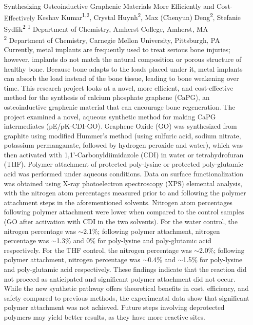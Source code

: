 \makeabstract
    {
    Synthesizing Osteoinductive Graphenic Materials More Efficiently and Cost-Effectively
    }
    {
    Keshav Kumar\textsuperscript{1,2}, Crystal Huynh\textsuperscript{2}, Max (Chenyun) Deng\textsuperscript{2}, Stefanie Sydlik\textsuperscript{2}
    }
    {
    \textsuperscript{1} Department of Chemistry, Amherst College, Amherst, MA\\
\textsuperscript{2} Department of Chemistry, Carnegie Mellon University, Pittsburgh, PA
    }
    {
    Currently, metal implants are frequently used to treat serious bone injuries; however, implants do not match the natural composition or porous structure of healthy bone. Because bone adapts to the loads placed under it, metal implants can absorb the load instead of the bone tissue, leading to bone weakening over time. This research project looks at a novel, more efficient, and cost-effective method for the synthesis of calcium phosphate graphene (CaPG), an osteoinductive graphenic material that can encourage bone regeneration.
    }
    {
    The project examined a novel, aqueous synthetic method for making CaPG intermediates (pE/pK-CDI-GO). Graphene Oxide (GO) was synthesized from graphite using modified Hummer{\textquoteright}s method (using sulfuric acid, sodium nitrate, potassium permanganate, followed by hydrogen peroxide and water), which was then activated with 1,1'-Carbonyldiimidazole (CDI) in water or tetrahydrofuran (THF). Polymer attachment of protected poly-lysine or protected poly-glutamic acid was performed under aqueous conditions. Data on surface functionalization was obtained using X-ray photoelectron spectroscopy (XPS) elemental analysis, with the nitrogen atom percentages measured prior to and following the polymer attachment steps in the aforementioned solvents.
    }
    {
    Nitrogen atom percentages following polymer attachment were lower when compared to the control samples (GO after activation with CDI in the two solvents). For the water control, the nitrogen percentage was $\sim$2.1\%; following polymer attachment, nitrogen percentage was $\sim$1.3\% and 0\% for poly-lysine and poly-glutamic acid respectively. For the THF control, the nitrogen percentage was $\sim$2.0\%; following polymer attachment, nitrogen percentage was $\sim$0.4\% and $\sim$1.5\% for poly-lysine and poly-glutamic acid respectively. These findings indicate that the reaction did not proceed as anticipated and significant polymer attachment did not occur.
    }
    {
    While the new synthetic pathway offers theoretical benefits in cost, efficiency, and safety compared to previous methods, the experimental data show that significant polymer attachment was not achieved. Future steps involving deprotected polymers may yield better results, as they have more reactive sites.
    }

    \newpage
    